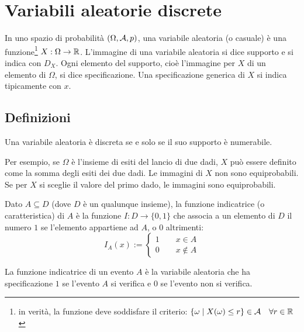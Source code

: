\section{Variabili aleatorie discrete}
\begin{defin}
	In uno spazio di probabilità $(\Omega, \mathcal A, p)$, una variabile aleatoria (o casuale) è una funzione\footnote{in verità, la funzione deve soddisfare il criterio: $\{\omega \mid X(\omega)\leq r\}\in\mathcal A\quad\forall r\in\mathbb R$} $X:\Omega\to \mathbb R$.
	L'immagine di una variabile aleatoria si dice supporto e si indica con $D_X$. Ogni elemento del supporto, cioè l'immagine per $X$ di un elemento di $\Omega$, si dice specificazione. Una specificazione generica di $X$ si indica tipicamente con $x$.
\end{defin}


\subsection{Definizioni}
\begin{defin}
	Una variabile aleatoria è discreta se e solo se il suo supporto è numerabile.
\end{defin}

Per esempio, se $\Omega$ è l'insieme di esiti del lancio di due dadi, $X$ può essere definito come la somma degli esiti dei due dadi. Le immagini di $X$ non sono equiprobabili. Se per $X$ si sceglie il valore del primo dado, le immagini sono equiprobabili.

\begin{defin}
	Dato $A\subseteq D$ (dove $D$ è un qualunque insieme), la funzione indicatrice (o caratteristica) di $A$ è la funzione $I:D\to \{0,1\}$ che associa a un elemento di $D$ il numero $1$ se l'elemento appartiene ad $A$, o $0$ altrimenti:
	\begin{equation*}
		I_A(x) := \begin{cases}
			1 \qquad x\in A \\
			0 \qquad x\notin A
		\end{cases}
	\end{equation*}
\end{defin}

\begin{defin} \label{def:findiceven}
	La funzione indicatrice di un evento $A$ è la variabile aleatoria che ha specificazione $1$ se l'evento $A$ si verifica e $0$ se l'evento non si verifica.
\end{defin}



